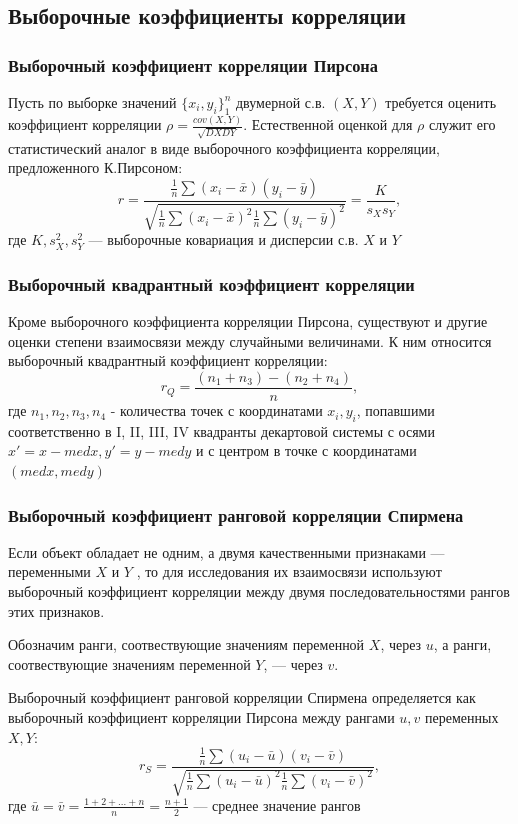 \documentclass[12pt,a4paper]{article}
\begin{document}
\subsection{Выборочные коэффициенты корреляции}
\subsubsection{Выборочный коэффициент корреляции Пирсона}
Пусть по выборке значений $\{x_i,y_i\}^n_1$ двумерной с.в. $(X,Y)$ требуется оценить коэффициент корреляции $\rho=\frac{cov(X,Y)}{\sqrt{DXDY}}$. Естественной оценкой для $\rho$ служит его статистический аналог в виде выборочного коэффициента корреляции, предложенного К.Пирсоном:
\begin{equation}
    r=\frac{\frac{1}{n}\sum{(x_i-\bar{x})(y_i-\bar{y})}}{\sqrt{\frac{1}{n}\sum{(x_i-\bar{x})^2}\frac{1}{n}\sum{(y_i-\bar{y})^2}}}=\frac{K}{s_Xs_Y},
\end{equation}
где $K,s^2_X,s^2_Y$ — выборочные ковариация и дисперсии с.в. $X$ и $Y$

\subsubsection{Выборочный квадрантный коэффициент корреляции}
Кроме выборочного коэффициента корреляции Пирсона, существуют и другие оценки степени взаимосвязи между случайными величинами. К ним относится выборочный квадрантный коэффициент корреляции:
\begin{equation}
    r_Q=\frac{(n_1+n_3)-(n_2+n_4)}{n},
\end{equation}
где $n_1,n_2,n_3,n_4$ - количества точек с координатами $x_i,y_i$, попавшими соответственно в I, II, III, IV квадранты декартовой системы с осями $x'=x-medx,y'=y-medy$ и с центром в точке с координатами $(medx,medy)$

\subsubsection{Выборочный коэффициент ранговой корреляции Спирмена}
Если объект обладает не одним, а двумя качественными признаками — переменными $X$ и $Y$ , то для исследования их взаимосвязи используют выборочный коэффициент корреляции между двумя последовательностями рангов этих признаков.

Обозначим ранги, соотвествующие значениям переменной $X$, через $u$, а ранги, соотвествующие значениям переменной $Y$, — через $v$.

Выборочный коэффициент ранговой корреляции Спирмена определяется как выборочный коэффициент корреляции Пирсона между рангами $u,v$ переменных $X,Y:$
\begin{equation}
    r_S=\frac{\frac{1}{n}\sum{(u_i-\bar{u})(v_i-\bar{v})}}{\sqrt{\frac{1}{n}\sum{(u_i-\bar{u})^2}\frac{1}{n}\sum{(v_i-\bar{v})^2}}},
\end{equation}
где $\bar{u}=\bar{v}=\frac{1+2+...+n}{n}=\frac{n+1}{2}$ — среднее значение рангов
\end{document}
